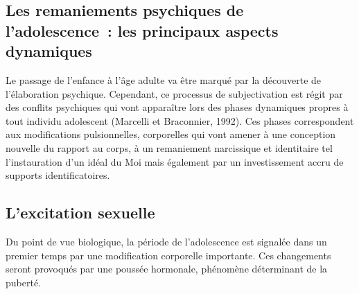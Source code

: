 \documentclass[12pt, a4paper]{book}
\begin{document}
\begin{spacing}{1.5}
\section{Les remaniements psychiques de l'adolescence : les principaux aspects dynamiques}

Le passage de l'enfance à l'âge adulte va être marqué par la découverte de l'élaboration psychique. Cependant, ce processus de subjectivation est régit par des conflits psychiques qui vont apparaître lors des phases dynamiques propres à tout individu adolescent (Marcelli et Braconnier, 1992). Ces phases correspondent aux modifications pulsionnelles, corporelles qui vont amener à une conception nouvelle du rapport au corps, à un remaniement narcissique et identitaire tel l'instauration d'un idéal du Moi mais également par un investissement accru de supports identificatoires.

\subsection{L'excitation sexuelle}

Du point de vue biologique, la période de l'adolescence est signalée dans un premier temps par une modification corporelle importante. Ces changements seront provoqués par une poussée hormonale, phénomène déterminant de la puberté.


\end{spacing}
\end{document}
